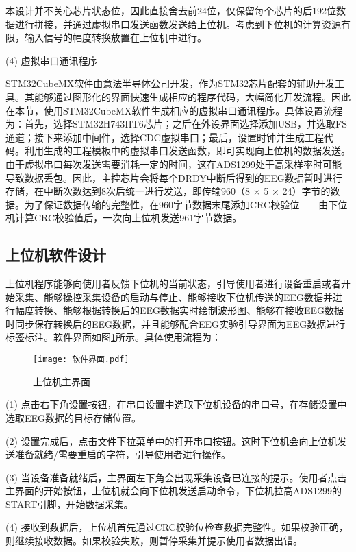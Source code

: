 本设计并不关心芯片状态位，因此直接舍去前24位，仅保留每个芯片的后192位数据进行拼接，并通过虚拟串口发送函数发送给上位机。考虑到下位机的计算资源有限，输入信号的幅度转换放置在上位机中进行。

(4) 虚拟串口通讯程序

STM32CubeMX软件由意法半导体公司开发，作为STM32芯片配套的辅助开发工具。其能够通过图形化的界面快速生成相应的程序代码，大幅简化开发流程。因此在本节，使用STM32CubeMX软件生成相应的虚拟串口通讯程序。具体设置流程为：首先，选择STM32H743IIT6芯片；之后在外设界面选择添加USB，并选取FS通道；接下来添加中间件，选择CDC虚拟串口；最后，设置时钟并生成工程代码。利用生成的工程模板中的虚拟串口发送函数，即可实现向上位机的数据发送。由于虚拟串口每次发送需要消耗一定的时间，这在ADS1299处于高采样率时可能导致数据丢包。因此，主控芯片会将每个DRDY中断后得到的EEG数据暂时进行存储，在中断次数达到8次后统一进行发送，即传输960（8 × 5 × 24）字节的数据。为了保证数据传输的完整性，在960字节数据末尾添加CRC校验位——由下位机计算CRC校验值后，一次向上位机发送961字节数据。

\subsection{上位机软件设计}

上位机程序能够向使用者反馈下位机的当前状态，引导使用者进行设备重启或者开始采集、能够操控采集设备的启动与停止、能够接收下位机传送的EEG数据并进行幅度转换、能够根据转换后的EEG数据实时绘制波形图、能够在接收EEG数据时同步保存转换后的EEG数据，并且能够配合EEG实验引导界面为EEG数据进行标签标注。软件界面如图\ref{fig2-20}所示。具体使用流程为：

\begin{figure}[h]
	\centering
	\texttt{[image: 软件界面.pdf]}
	\caption{上位机主界面} 
	\label{fig2-20}
\end{figure}

(1) 点击右下角设置按钮，在串口设置中选取下位机设备的串口号，在存储设置中选取EEG数据的目标存储位置。

(2) 设置完成后，点击文件下拉菜单中的打开串口按钮。这时下位机会向上位机发送准备就绪/需要重启的字符，引导使用者进行操作。

(3) 当设备准备就绪后，主界面左下角会出现采集设备已连接的提示。使用者点击主界面的开始按钮，上位机就会向下位机发送启动命令，下位机拉高ADS1299的START引脚，开始数据采集。

(4) 接收到数据后，上位机首先通过CRC校验位检查数据完整性。如果校验正确，则继续接收数据。如果校验失败，则暂停采集并提示使用者数据出错。

